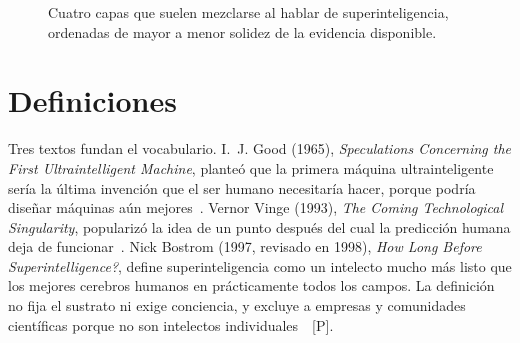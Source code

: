 \documentclass[10pt]{article}
\newcommand{\tP}{\textsf{\small[P]}}
\begin{document}
\begin{figure}[t]
\centering
{}
\caption{Cuatro capas que suelen mezclarse al hablar de superinteligencia, ordenadas de mayor a menor solidez de la evidencia disponible.}
\label{fig:capas}
\end{figure}

\section{Definiciones}

Tres textos fundan el vocabulario. I.~J. Good (1965), \emph{Speculations Concerning the First Ultraintelligent Machine}, plante\'o que la primera m\'aquina ultrainteligente ser\'ia la \'ultima invenci\'on que el ser humano necesitar\'ia hacer, porque podr\'ia dise\~nar m\'aquinas a\'un mejores~\cite{good1965}. Vernor Vinge (1993), \emph{The Coming Technological Singularity}, populariz\'o la idea de un punto despu\'es del cual la predicci\'on humana deja de funcionar~\cite{vinge1993}. Nick Bostrom (1997, revisado en 1998), \emph{How Long Before Superintelligence?}, define superinteligencia como un intelecto mucho m\'as listo que los mejores cerebros humanos en pr\'acticamente todos los campos. La definici\'on no fija el sustrato ni exige conciencia, y excluye a empresas y comunidades cient\'ificas porque no son intelectos individuales~\cite{bostrom1998}~\tP.
\end{document}
